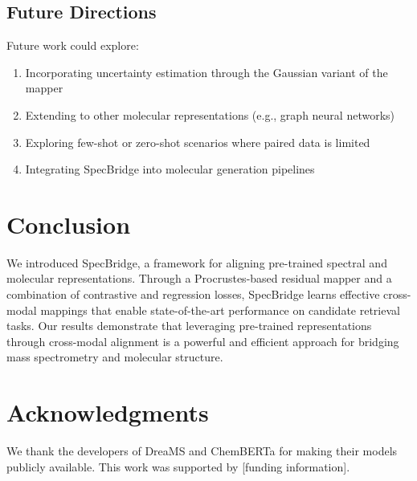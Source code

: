 \documentclass[11pt]{article}
\begin{document}
\subsection{Future Directions}

Future work could explore:

\begin{enumerate}
    \item Incorporating uncertainty estimation through the Gaussian variant of the mapper
    \item Extending to other molecular representations (e.g., graph neural networks)
    \item Exploring few-shot or zero-shot scenarios where paired data is limited
    \item Integrating SpecBridge into molecular generation pipelines
\end{enumerate}

\section{Conclusion}

We introduced SpecBridge, a framework for aligning pre-trained spectral and molecular representations. Through a Procrustes-based residual mapper and a combination of contrastive and regression losses, SpecBridge learns effective cross-modal mappings that enable state-of-the-art performance on candidate retrieval tasks. Our results demonstrate that leveraging pre-trained representations through cross-modal alignment is a powerful and efficient approach for bridging mass spectrometry and molecular structure.

\section*{Acknowledgments}

We thank the developers of DreaMS and ChemBERTa for making their models publicly available. This work was supported by [funding information].
\end{document}
